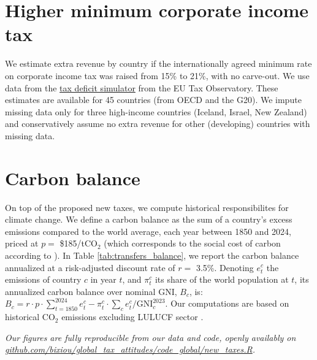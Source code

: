 \documentclass[12pt,english]{article}
\begin{document}
\section{Higher minimum corporate income tax}

We estimate extra revenue by country if the internationally agreed minimum rate on corporate income tax was raised from 15\% to 21\%, with no carve-out. We use data from the \href{https://www.taxobservatory.eu/fr/base-de-donn%C3%A9es/the-tax-deficit-simulator/}{tax deficit simulator} from the EU Tax Observatory. These estimates are available for 45 countries (from OECD and the G20). We impute missing data only for three high-income countries (Iceland, Israel, New Zealand) and conservatively assume no extra revenue for other (developing) countries with missing data.

\section{Carbon balance}

On top of the proposed new taxes, we compute historical responsibilites for climate change. We define a carbon balance as the sum of a country's excess emissions compared to the world average, each year between 1850 and 2024, priced at $p=$ \$185/tCO$_\text{2}$ (which corresponds to the social cost of carbon according to \citealp{rennert_comprehensive_2022}). 
In Table \ref{tab:transfers_balance}, we report the carbon balance annualized at a risk-adjusted discount rate of $r =$ 3.5\%. Denoting $e_t^c$ the emissions of country $c$ in year $t$, and $\pi_t^c$ its share of the world population at $t$, its annualized carbon balance over nominal GNI, $B_c$, is: $ B_c = r \cdot p \cdot \sum_{t=1850}^{2024} e_t^c - \pi_t^c \cdot \sum_c e_t^c / \text{GNI}_c^{2023}\text{.}$ Our computations are based on historical CO$_\text{2}$ emissions excluding LULUCF sector \citep{gutschow_country-resolved_2021}.

\clearpage

\textit{Our figures are fully reproducible from our data and code, openly availably on\\ \href{https://github.com/bixiou/global_tax_attitudes/code_global/new_taxes.R}{github.com/bixiou/global\_tax\_attitudes/code\_global/new\_taxes.R}. %
}
\end{document}
